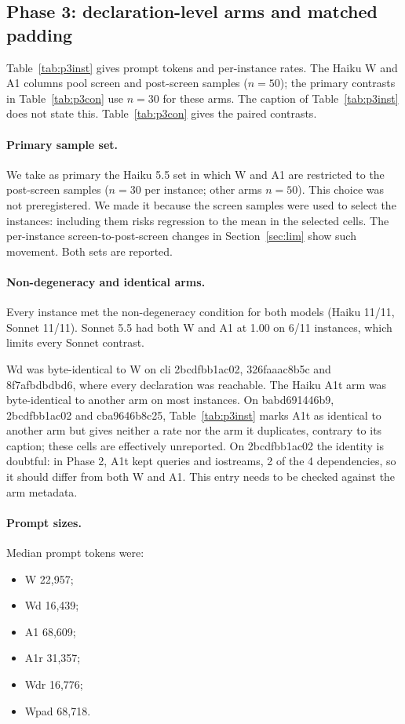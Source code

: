 \subsection{Phase 3: declaration-level arms and matched padding}

Table~\ref{tab:p3inst} gives prompt tokens and per-instance rates. The Haiku W and A1 columns pool screen and post-screen samples ($n=50$); the primary contrasts in Table~\ref{tab:p3con} use $n=30$ for these arms. The caption of Table~\ref{tab:p3inst} does not state this. Table~\ref{tab:p3con} gives the paired contrasts.

\paragraph{Primary sample set.} We take as primary the Haiku 5.5 set in which W and A1 are restricted to the post-screen samples ($n=30$ per instance; other arms $n=50$). This choice was not preregistered. We made it because the screen samples were used to select the instances: including them risks regression to the mean in the selected cells. The per-instance screen-to-post-screen changes in Section~\ref{sec:lim} show such movement. Both sets are reported.

\paragraph{Non-degeneracy and identical arms.} Every instance met the non-degeneracy condition for both models (Haiku 11/11, Sonnet 11/11). Sonnet 5.5 had both W and A1 at 1.00 on 6/11 instances, which limits every Sonnet contrast.

Wd was byte-identical to W on cli 2bcdfbb1ac02, 326faaac8b5c and 8f7afbdbdbd6, where every declaration was reachable. The Haiku A1t arm was byte-identical to another arm on most instances. On babd691446b9, 2bcdfbb1ac02 and cba9646b8c25, Table~\ref{tab:p3inst} marks A1t as identical to another arm but gives neither a rate nor the arm it duplicates, contrary to its caption; these cells are effectively unreported. On 2bcdfbb1ac02 the identity is doubtful: in Phase 2, A1t kept queries and iostreams, 2 of the 4 dependencies, so it should differ from both W and A1. This entry needs to be checked against the arm metadata.

\paragraph{Prompt sizes.} Median prompt tokens were:
\begin{itemize}
\item W 22,957;
\item Wd 16,439;
\item A1 68,609;
\item A1r 31,357;
\item Wdr 16,776;
\item Wpad 68,718.
\end{itemize}

